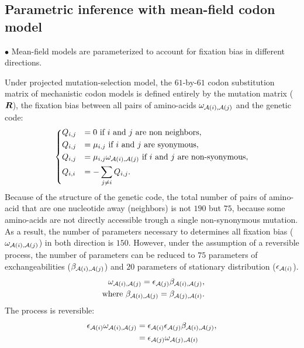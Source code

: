 \subsection{Parametric inference with mean-field {codon} model}

$\bullet$ Mean-field models are parameterized to account for fixation bias in different directions.

Under projected mutation-selection model, the $61$-by-$61$ \gls{codon} \gls{substitution} matrix of mechanistic \gls{codon} models is defined entirely by the mutation matrix ($\bm{R}$), the fixation bias between all pairs of amino-acids $\omega_{\mathcal{A}({i}), \mathcal{A}({j})}$ and the genetic code:
\begin{equation}
    \begin{dcases}
        Q_{{i}, {j}} & = 0 \text{ if ${i}$ and ${j}$ are non neighbors}, \\
        Q_{{i}, {j}} & = \mu_{{i}, {j}} \text{ if ${i}$ and ${j}$ are syonymous}, \\
        Q_{{i}, {j}} & = \mu_{{i}, {j}} \omega_{\mathcal{A}({i}), \mathcal{A}({j})} \text{ if ${i}$ and ${j}$ are non-syonymous}, \\
        Q_{{i}, {i}} & = - \sum\limits_{{j} \neq {i}} Q_{{i}, {j}}.
    \end{dcases}
    \label{eq:codon-mean-field}
\end{equation}
Because of the structure of the genetic code, the total number of pairs of amino-acid that are one nucleotide away (neighbors) is not $190$ but $75$, because some amino-acids are not directly accessible trough a single non-synonymous mutation.
As a result, the number of parameters necessary to determines all fixation bias ($\omega_{\mathcal{A}({i}), \mathcal{A}({j})}$) in both direction is $150$.
However, under the assumption of a reversible process, the number of parameters can be reduced to $75$ parameters of exchangeabilities ($\beta_{\mathcal{A}({i}), \mathcal{A}({j})}$) and $20$ parameters of stationary distribution ($\epsilon_{\mathcal{A}({i})}$).
\begin{align}
    \omega_{\mathcal{A}({i}), \mathcal{A}({j})} = \epsilon_{\mathcal{A}({j})} \beta_{\mathcal{A}({i}), \mathcal{A}({j})}, \\
    \text{ where } \beta_{\mathcal{A}({i}), \mathcal{A}({j})} = \beta_{\mathcal{A}({j}), \mathcal{A}({i})}.
\end{align}
The process is reversible:
\begin{align}
    \epsilon_{\mathcal{A}({i})} \omega_{\mathcal{A}({i}), \mathcal{A}({j})} & = \epsilon_{\mathcal{A}({i})} \epsilon_{\mathcal{A}({j})} \beta_{\mathcal{A}({i}), \mathcal{A}({j})}, \\
     & = \epsilon_{\mathcal{A}({j})} \omega_{\mathcal{A}({j}), \mathcal{A}({i})}
\end{align}

